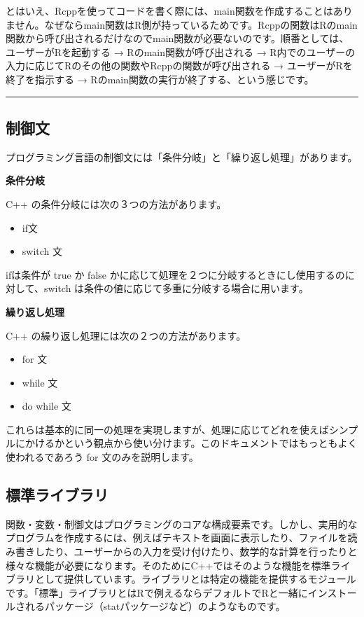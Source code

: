 \documentclass[]{book}
\providecommand{\tightlist}{%
  \setlength{\itemsep}{0pt}\setlength{\parskip}{0pt}}
\begin{document}
とはいえ、Rcppを使ってコードを書く際には、main関数を作成することはありません。なぜならmain関数はR側が持っているためです。Rcppの関数はRのmain関数から呼び出されるだけなのでmain関数が必要ないのです。順番としては、ユーザーがRを起動する
→ Rのmain関数が呼び出される →
R内でのユーザーの入力に応じてRのその他の関数やRcppの関数が呼び出される →
ユーザーがRを終了を指示する →
Rのmain関数の実行が終了する、という感じです。

\begin{center}\rule{0.5\linewidth}{\linethickness}\end{center}

\subsection{制御文}

プログラミング言語の制御文には「条件分岐」と「繰り返し処理」があります。

\textbf{条件分岐}

C++ の条件分岐には次の３つの方法があります。

\begin{itemize}
\tightlist
\item
  if文
\item
  switch 文
\end{itemize}

ifは条件が true か false
かに応じて処理を２つに分岐するときにし使用するのに対して、switch
は条件の値に応じて多重に分岐する場合に用います。

\textbf{繰り返し処理}

C++ の繰り返し処理には次の２つの方法があります。

\begin{itemize}
\tightlist
\item
  for 文
\item
  while 文
\item
  do while 文
\end{itemize}

これらは基本的に同一の処理を実現しますが、処理に応じてどれを使えばシンプルにかけるかという観点から使い分けます。このドキュメントではもっともよく使われるであろう
for 文のみを説明します。

\subsection{標準ライブラリ}

関数・変数・制御文はプログラミングのコアな構成要素です。しかし、実用的なプログラムを作成するには、例えばテキストを画面に表示したり、ファイルを読み書きしたり、ユーザーからの入力を受け付けたり、数学的な計算を行ったりと様々な機能が必要になります。そのためにC++ではそのような機能を標準ライブラリとして提供しています。ライブラリとは特定の機能を提供するモジュールです。「標準」ライブラリとはRで例えるならデフォルトでRと一緒にインストールされるパッケージ（statパッケージなど）のようなものです。
\end{document}
